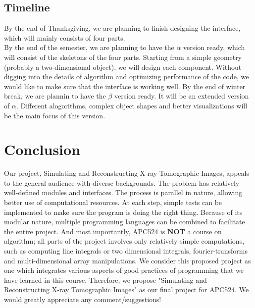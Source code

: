 \documentclass[11]{article}
\begin{document}
\subsection{Timeline}
By the end of Thanksgiving, we are planning to finish designing the interface, which will mainly consists of four parts.\\
By the end of the semester, we are planning to have the $\alpha$ version ready, which will consist of the skeletons of the four parts. Starting from a simple geometry (probably a two-dimensional object), we will design each component. Without digging into the details of algorithm and optimizing performance of the code, we would like to make sure that the interface is working well. 
By the end of winter break, we are plannin to have the $\beta$ version ready. It will be an extended version of $\alpha$. Different alogorithms, complex object shapes and better visualizations will be the main focus of this version.

	
\section{Conclusion}
Our project, Simulating and Reconstructing X-ray Tomographic Images, appeals to the general audience with diverse backgrounds. The problem has relatively well-defined modules and interfaces. The process is parallel in nature, allowing better use of computational resources. At each step, simple tests can be implemented to make sure the program is doing the right thing. Because of its modular nature, multiple programming languages can be combined to facilitate the entire project. And most importantly, APC524 is \textbf{NOT} a course on algorithm; all parts of the project involves only relatively simple computations, such as computing line integrals or two dimensional integrals, fourier-transforms and multi-dimensional array manipulations. We consider this proposed project as one which integrates various aspects of good practices of programming that we have learned in this course. Therefore, we propose "Simulating and Reconstructing X-ray Tomographic Images" as our final project for APC524. We would greatly appreciate any comment/suggestions! 
\end{document}
